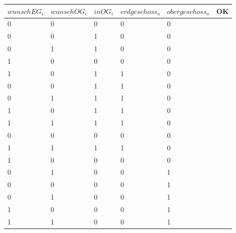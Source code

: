 \documentclass[a4paper,12pt,bibtotocnumbered]{scrartcl} %
\numberwithin{equation}{section} %
\begin{document}
\begin{table}[H]
	\begin{tabular}{llllll}
		$wunschEG_i$ & $wunschOG_i$ & \multicolumn{1}{l|}{$inOG_i$} & $erdgeschoss_o$ & $obergeschoss_o$ & OK\\ \hline
		0          & 0          & \multicolumn{1}{l|}{0}      & 0             & 0 &               \\
		0          & 0          & \multicolumn{1}{l|}{1}      & 0             & 0 &               \\
		0          & 1          & \multicolumn{1}{l|}{1}      & 0             & 0 &               \\
		1          & 0          & \multicolumn{1}{l|}{0}      & 0             & 0 &               \\ \hline
		1          & 0          & \multicolumn{1}{l|}{1}      & 1             & 0 &               \\
		0          & 0          & \multicolumn{1}{l|}{1}      & 1             & 0 &               \\
		0          & 1          & \multicolumn{1}{l|}{1}      & 1             & 0 &               \\
		1          & 0          & \multicolumn{1}{l|}{1}      & 1             & 0 &               \\
		1          & 1          & \multicolumn{1}{l|}{1}      & 1             & 0 &               \\ \hline
		0          & 0          & \multicolumn{1}{l|}{0}      & 0             & 0 &               \\ \hline
		1          & 1          & \multicolumn{1}{l|}{1}      & 1             & 0 &               \\ \hline
		1          & 0          & \multicolumn{1}{l|}{0}      & 0             & 0 &               \\ \hline
		0          & 1          & \multicolumn{1}{l|}{0}      & 0             & 1 &               \\
		0          & 0          & \multicolumn{1}{l|}{0}      & 0             & 1 &               \\
		0          & 1          & \multicolumn{1}{l|}{0}      & 0             & 1 &               \\
		1          & 0          & \multicolumn{1}{l|}{0}      & 0             & 1 &               \\
		1          & 1          & \multicolumn{1}{l|}{0}      & 0             & 1 &               \\ \hline

\end{tabular}
\end{table}
\end{document}
